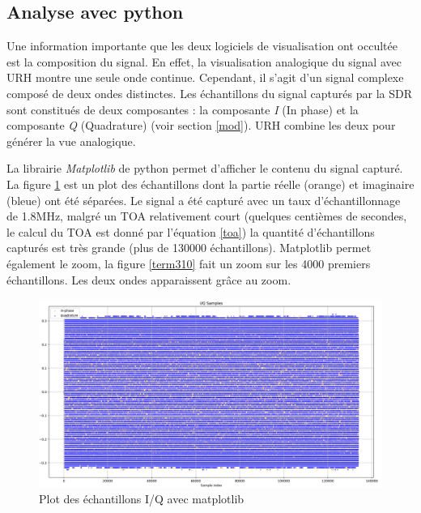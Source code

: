 \subsection{Analyse avec python}

Une information importante que les deux logiciels de visualisation ont occultée est la composition du signal. En effet, la visualisation analogique du signal avec \ac{URH} montre une seule onde continue. Cependant, il s'agit d'un signal complexe composé de deux ondes distinctes. Les échantillons du signal capturés par la \ac{SDR} sont constitués de deux composantes : la composante \textit{I} (In phase) et la composante \textit{Q} (Quadrature) (voir section \ref{mod}). \ac{URH} combine les deux pour générer la vue analogique.

\vspace{0.1cm}

La librairie \textit{Matplotlib} de python permet d'afficher le contenu du signal capturé. La figure  \ref{term309} est un plot des échantillons dont la partie réelle (orange) et imaginaire (bleue) ont été séparées. Le signal a été capturé avec un taux d'échantil\-lonnage de 1.8MHz, malgré un \ac{TOA} relativement court (quelques centièmes de secondes, le calcul du \ac{TOA} est donné par l'équation \ref{toa}) la quantité d'échantillons capturés est très grande (plus de 130000 échantillons). Matplotlib permet également le zoom, la figure \ref{term310} fait un zoom sur les 4000 premiers échantillons. Les deux ondes apparaissent grâce au zoom.

\begin{figure}[h]
\centering

\includegraphics[scale=0.13]{images/iq1.png}
\caption{Plot des échantillons I/Q avec matplotlib}\label{term309}
\end{figure}



